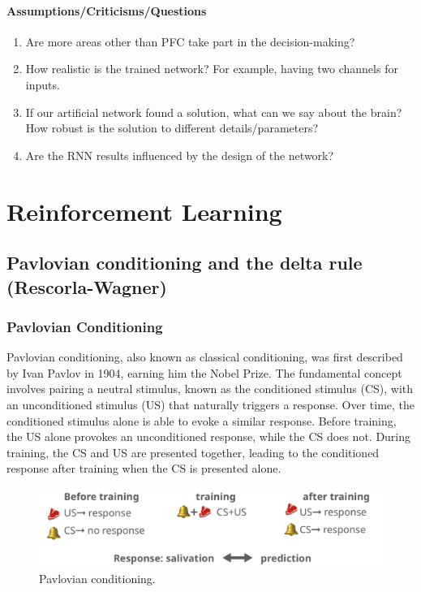 \documentclass[11pt]{book} %
\begin{document}
\subsubsection{Assumptions/Criticisms/Questions}
\begin{enumerate}
    \item Are more areas other than PFC take part in the decision-making?
    \item How realistic is the trained network? For example, having two channels for inputs.
    \item If our artificial network found a solution, what can we say about the brain? How robust is the solution to different details/parameters?
    \item Are the RNN results influenced by the design of the network?
\end{enumerate}


%
%
%
%
%
%
%
%
%
%
%
%
%
%
%
%


\chapter{Reinforcement Learning}

\section{Pavlovian conditioning and the delta rule (Rescorla-Wagner)}

\subsection{Pavlovian Conditioning}

Pavlovian conditioning, also known as classical conditioning, was first described by Ivan Pavlov in 1904, earning him the Nobel Prize. 
The fundamental concept involves pairing a neutral stimulus, known as the conditioned stimulus (CS), with an unconditioned stimulus (US) that naturally triggers a response. 
Over time, the conditioned stimulus alone is able to evoke a similar response.
Before training, the US alone provokes an unconditioned response, while the CS does not. During training, the CS and US are presented together, leading to the conditioned response after training when the CS is presented alone.

\begin{figure}[ht]
\centering
\includegraphics[width=\textwidth]{./Figs/pavlov.jpeg}
\caption{Pavlovian conditioning.}
\label{fig:pavlovian_conditioning}
\end{figure}
\end{document}
